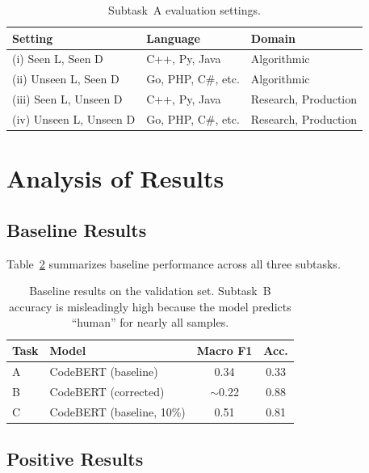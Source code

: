 \documentclass[11pt]{article}
\begin{document}
\begin{table}[ht]
\centering
\small
\begin{tabularx}{\columnwidth}{@{}l l X@{}}
\toprule
\textbf{Setting} & \textbf{Language} & \textbf{Domain} \\ \midrule
(i) Seen L, Seen D & C++, Py, Java & Algorithmic \\
(ii) Unseen L, Seen D & Go, PHP, C\#, etc. & Algorithmic \\
(iii) Seen L, Unseen D & C++, Py, Java & Research, Production \\
(iv) Unseen L, Unseen D & Go, PHP, C\#, etc. & Research, Production \\ \bottomrule
\end{tabularx}
\caption{Subtask~A evaluation settings.}
\label{tab:taskA_eval}
\end{table}

\section{Analysis of Results}
\label{sec:results}

\subsection{Baseline Results}

Table~\ref{tab:baseline_results} summarizes baseline performance across all three subtasks.

\begin{table}[ht]
\centering
\small
\begin{tabularx}{\columnwidth}{@{}l X c c@{}}
\toprule
\textbf{Task} & \textbf{Model} & \textbf{Macro F1} & \textbf{Acc.} \\ \midrule
A & CodeBERT (baseline) & 0.34 & 0.33 \\
B & CodeBERT (corrected) & $\sim$0.22 & 0.88 \\
C & CodeBERT (baseline, 10\%) & 0.51 & 0.81 \\
\bottomrule
\end{tabularx}
\caption{Baseline results on the validation set. Subtask~B accuracy is misleadingly high because the model predicts ``human'' for nearly all samples.}
\label{tab:baseline_results}
\end{table}

\subsection{Positive Results}
\end{document}
